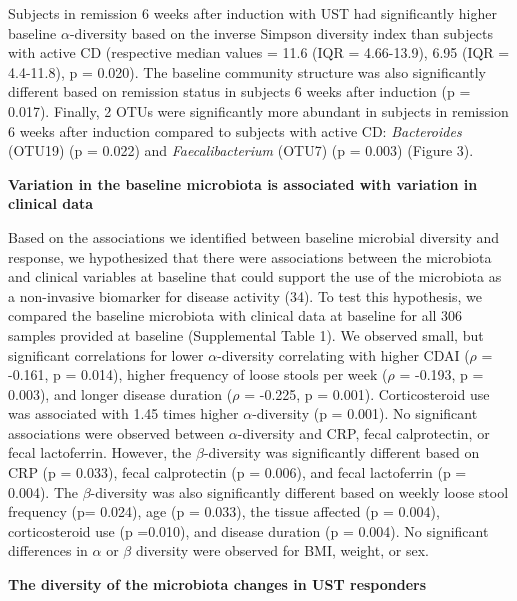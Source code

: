 \documentclass[12pt,]{article}
\begin{document}
Subjects in remission 6 weeks after induction with UST had significantly
higher baseline \({\alpha}\)-diversity based on the inverse Simpson
diversity index than subjects with active CD (respective median values =
11.6 (IQR = 4.66-13.9), 6.95 (IQR = 4.4-11.8), p = 0.020). The baseline
community structure was also significantly different based on remission
status in subjects 6 weeks after induction (p = 0.017). Finally, 2 OTUs
were significantly more abundant in subjects in remission 6 weeks after
induction compared to subjects with active CD: \emph{Bacteroides}
(OTU19) (p = 0.022) and \emph{Faecalibacterium} (OTU7) (p = 0.003)
(Figure 3).

\textbf{Variation in the baseline microbiota is associated with
variation in clinical data}

Based on the associations we identified between baseline microbial
diversity and response, we hypothesized that there were associations
between the microbiota and clinical variables at baseline that could
support the use of the microbiota as a non-invasive biomarker for
disease activity (34). To test this hypothesis, we compared the baseline
microbiota with clinical data at baseline for all 306 samples provided
at baseline (Supplemental Table 1). We observed small, but significant
correlations for lower \({\alpha}\)-diversity correlating with higher
CDAI (\({\rho}\) = -0.161, p = 0.014), higher frequency of loose stools
per week (\({\rho}\) = -0.193, p = 0.003), and longer disease duration
(\({\rho}\) = -0.225, p = 0.001). Corticosteroid use was associated with
1.45 times higher \({\alpha}\)-diversity (p = 0.001). No significant
associations were observed between \({\alpha}\)-diversity and CRP, fecal
calprotectin, or fecal lactoferrin. However, the \({\beta}\)-diversity
was significantly different based on CRP (p = 0.033), fecal calprotectin
(p = 0.006), and fecal lactoferrin (p = 0.004). The
\({\beta}\)-diversity was also significantly different based on weekly
loose stool frequency (p= 0.024), age (p = 0.033), the tissue affected
(p = 0.004), corticosteroid use (p =0.010), and disease duration (p =
0.004). No significant differences in \({\alpha}\) or \({\beta}\)
diversity were observed for BMI, weight, or sex.

\textbf{The diversity of the microbiota changes in UST responders}
\end{document}

